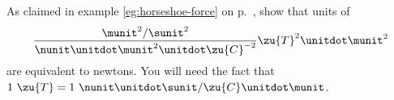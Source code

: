 As claimed in example \ref{eg:horseshoe-force} on p.~\pageref{eg:horseshoe-force},
show that units of
\begin{equation*}
  \frac{\munit^2/\sunit^2}{\nunit\unitdot\munit^2\unitdot\zu{C}^{-2}}\zu{T}^2\unitdot\munit^2
\end{equation*}
are equivalent to newtons. You will need the fact that $1\ \zu{T}=1\ \nunit\unitdot\sunit/\zu{C}\unitdot\munit$.
